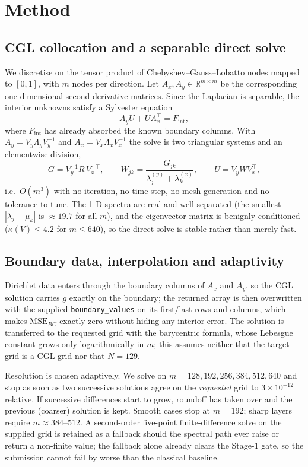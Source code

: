 \documentclass[10pt,a4paper]{article}
\newcommand{\condMax}{4.2}
\begin{document}
\section{Method}

\subsection{CGL collocation and a separable direct solve}
We discretise on the tensor product of Chebyshev--Gauss--Lobatto nodes mapped
to $[0,1]$, with $m$ nodes per direction.  Let $A_x,A_y\in\mathbb{R}^{m\times m}$
be the corresponding one-dimensional second-derivative matrices.  Since the
Laplacian is separable, the interior unknowns satisfy a Sylvester equation
\begin{equation}
A_y U + U A_x^{\!\top} = F_{\mathrm{int}} ,
\end{equation}
where $F_{\mathrm{int}}$ has already absorbed the known boundary columns.  With
$A_y=V_y\Lambda_yV_y^{-1}$ and $A_x=V_x\Lambda_xV_x^{-1}$ the solve is two
triangular systems and an elementwise division,
\begin{equation}
G=V_y^{-1}R\,V_x^{-\top},\qquad
W_{jk}=\frac{G_{jk}}{\lambda^{(y)}_j+\lambda^{(x)}_k},\qquad
U=V_yWV_x^{\!\top},
\end{equation}
i.e.\ $O(m^3)$ with no iteration, no time step, no mesh generation and no
tolerance to tune.  The 1-D spectra are real and well separated (the smallest
$|\lambda_j+\mu_k|$ is $\approx 19.7$ for all $m$), and the eigenvector matrix is
benignly conditioned ($\kappa(V)\le\condMax$ for $m\le640$), so the direct solve
is stable rather than merely fast.

\subsection{Boundary data, interpolation and adaptivity}
Dirichlet data enters through the boundary columns of $A_x$ and $A_y$, so the
CGL solution carries $g$ exactly on the boundary; the returned array is then
overwritten with the supplied \texttt{boundary\_values} on its first/last rows
and columns, which makes $\mathrm{MSE}_{BC}$ exactly zero without hiding any
interior error.  The solution is transferred to the requested grid with the
barycentric formula, whose Lebesgue constant grows only logarithmically in $m$;
this assumes neither that the target grid is a CGL grid nor that $N=129$.

Resolution is chosen adaptively.  We solve on $m=128,192,256,384,512,640$ and
stop as soon as two successive solutions agree on the \emph{requested} grid to
$3\times10^{-12}$ relative.  If successive differences start to grow, roundoff
has taken over and the previous (coarser) solution is kept.  Smooth cases stop
at $m=192$; sharp layers require $m\approx384$--$512$.  A second-order
five-point finite-difference solve on the supplied grid is retained as a
fallback should the spectral path ever raise or return a non-finite value; the
fallback alone already clears the Stage-1 gate, so the submission cannot fail by
worse than the classical baseline.
\end{document}
